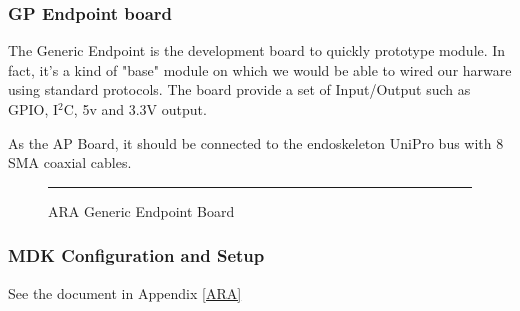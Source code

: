 \subsubsection{GP Endpoint board}

The Generic Endpoint is the development board to quickly prototype module. In fact, it's a kind of "base" module on which we would be able to wired our harware using standard protocols. The board provide a set of Input/Output such as GPIO, I$^2$C, 5v and 3.3V output.

As the AP Board, it should be connected to the endoskeleton UniPro bus with 8 SMA coaxial cables.

\begin{figure}[htbp]
  \centering
    \rule{35em}{0.5pt}
  \caption[ARA Generic Endpoint Board]{ARA Generic Endpoint Board}
  \label{fig:gpendpoint}
\end{figure}

\subsubsection{MDK Configuration and Setup}

See the document in Appendix \ref{ARA}